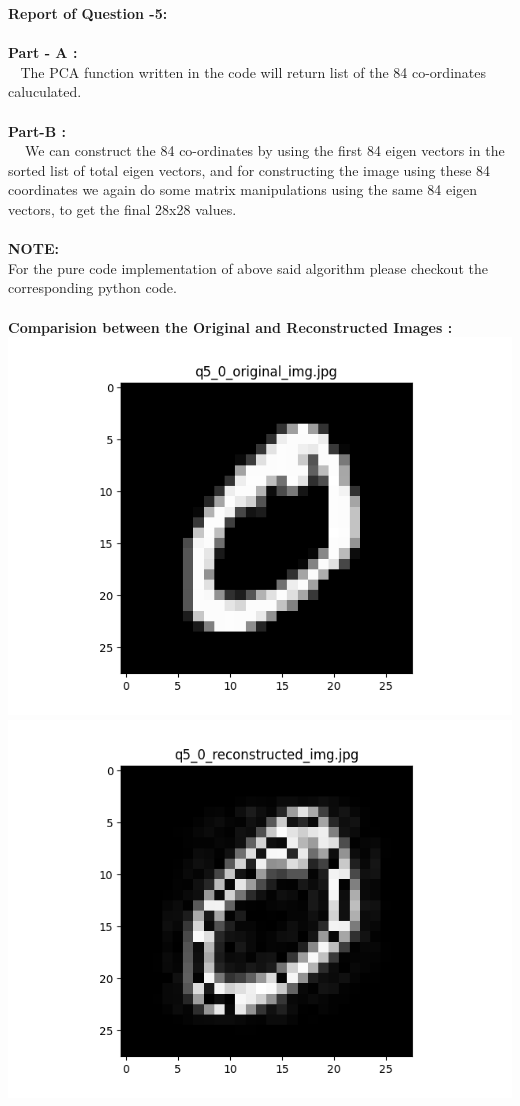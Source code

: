 \documentclass{article}
\begin{document}
$$ $$ 
\textbf{\large {Report of Question -5:}} \\ \\
    \textbf{Part - A :} \\
    $~~~~$The PCA function written in the code will return list of the 84 co-ordinates caluculated.
    \\ \\ 
    \textbf{Part-B :} \\
    $~~~~$ We can construct the 84 co-ordinates by using the first 84 eigen vectors in the sorted list of total eigen vectors,
    and for constructing the image using these 84 coordinates we again do some matrix manipulations using the same 84 eigen vectors,
    to get the final 28x28 values. \\ \\
    \textbf{NOTE:}\\
    For the pure code implementation of above said algorithm please checkout the corresponding python code.
    \\ \\
    \newpage
    \textbf{\large Comparision between the Original and Reconstructed Images :} \\
    \includegraphics[scale=.6]{../results/q5/original/q5_0_original.png}
    \includegraphics[scale=.6]{../results/q5/reconstrcuted/q5_0_reconstructed.png}
\end{document}
